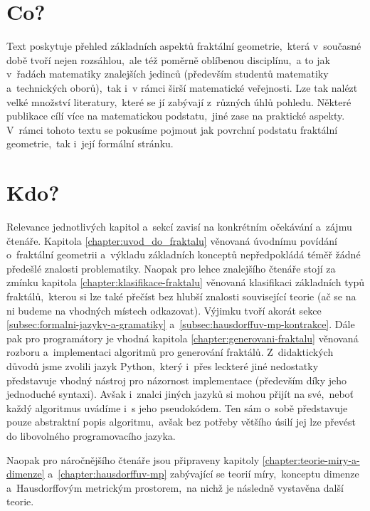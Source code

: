 \label{chapter:predmluva}

\section*{Co?}

Text poskytuje přehled základních aspektů fraktální geometrie,~která v~současné době tvoří nejen rozsáhlou,~ale též poměrně oblíbenou disciplínu,~a to jak v~řadách matematiky znalejších jedinců (především studentů matematiky a~technických oborů),~tak i~v rámci širší matematické veřejnosti. Lze tak nalézt velké množství literatury,~které se jí zabývají z~různých úhlů pohledu. Některé publikace cílí více na matematickou podstatu,~jiné zase na praktické aspekty. V~rámci tohoto textu se pokusíme pojmout jak povrchní podstatu fraktální geometrie,~tak i~její formální stránku.

\section*{Kdo?}

Relevance jednotlivých kapitol a~sekcí zavisí na konkrétním očekávání a~zájmu čtenáře. Kapitola \ref{chapter:uvod_do_fraktalu} věnovaná úvodnímu povídání o~fraktální geometrii a~výkladu základních konceptů nepředpokládá téměř žádné předešlé znalosti problematiky. Naopak pro lehce znalejšího čtenáře stojí za zmínku kapitola \ref{chapter:klasifikace-fraktalu} věnovaná klasifikaci základních typů fraktálů,~kterou si lze také přečíst bez hlubší znalosti související teorie (ač se na ni budeme na vhodných místech odkazovat). Výjimku tvoří akorát sekce \ref{subsec:formalni-jazyky-a-gramatiky} a~\ref{subsec:hausdorffuv-mp-kontrakce}. Dále pak pro programátory je vhodná kapitola \ref{chapter:generovani-fraktalu} věnovaná rozboru a~implementaci algoritmů pro generování fraktálů. Z~didaktických důvodů jsme zvolili jazyk Python,~který i~přes leckteré jiné nedostatky představuje vhodný nástroj pro názornost implementace (především díky jeho jednoduché syntaxi). Avšak i~znalci jiných jazyků si mohou přijít na své,~neboť každý algoritmus uvádíme i~s jeho pseudokódem. Ten sám o~sobě představuje pouze abstraktní popis algoritmu,~avšak bez potřeby většího úsilí jej lze převést do libovolného programovacího jazyka.

Naopak pro náročnějšího čtenáře jsou připraveny kapitoly \ref{chapter:teorie-miry-a-dimenze} a~\ref{chapter:hausdorffuv-mp} zabývající se teorií míry,~konceptu dimenze a~Hausdorffovým metrickým prostorem,~na nichž je následně vystavěna další teorie.

